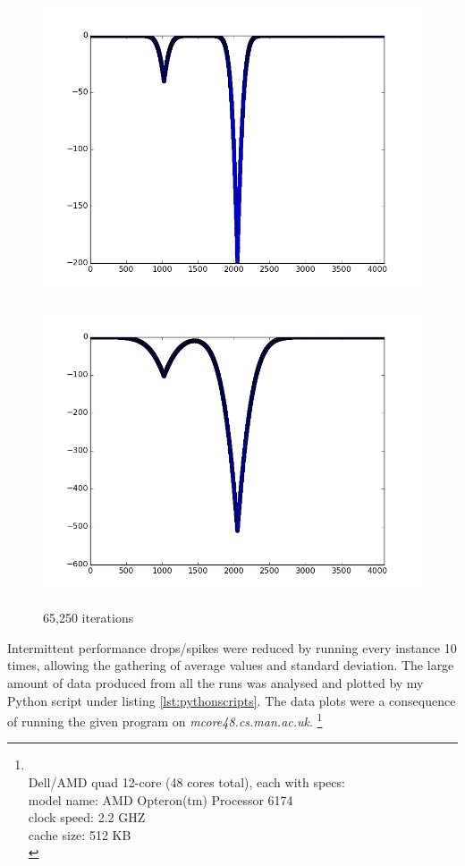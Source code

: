 \documentclass{article}
\begin{document}
\begin{figure}
\begin{minipage}{0.45\textwidth}
    \includegraphics[width=1\linewidth, natwidth=800, natheight=600]{graphs/it10000.png}
    \label{fig:it10000}
  \end{minipage}
  \begin{minipage}{0.45\textwidth}
    \caption{65,250 iterations}
    \includegraphics[width=1\linewidth, natwidth=800, natheight=600]{graphs/itFinal.png}
    \label{fig:itFinal}
  \end{minipage}
  \end{figure}	

Intermittent performance drops/spikes were reduced by running every instance 10 times, allowing the gathering of average values and standard deviation. The large amount of data produced from all the runs was analysed and plotted by my Python script under listing \ref{lst:pythonscripts}. The data plots were a consequence of running the given program on \textit{mcore48.cs.man.ac.uk}. \footnote{\label{machinespecs} \\
  Dell/AMD quad 12-core (48 cores total), each with specs:\\
  model name: AMD Opteron(tm) Processor 6174 \\
  clock speed: 2.2 GHZ \\
  cache size: 512 KB \\}
\end{document}
